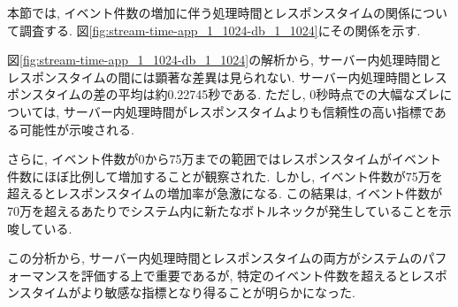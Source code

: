 \documentclass[../../../../../main]{subfiles}
\begin{document}
    \label{subsubsec:result-streaming-only-limit-time}

    本節では, イベント件数の増加に伴う処理時間とレスポンスタイムの関係について調査する. 図\ref{fig:stream-time-app_1_1024-db_1_1024}にその関係を示す.

    

    図\ref{fig:stream-time-app_1_1024-db_1_1024}の解析から, サーバー内処理時間とレスポンスタイムの間には顕著な差異は見られない. サーバー内処理時間とレスポンスタイムの差の平均は約0.22745秒である. ただし, 0秒時点での大幅なズレについては, サーバー内処理時間がレスポンスタイムよりも信頼性の高い指標である可能性が示唆される.

    さらに, イベント件数が0から75万までの範囲ではレスポンスタイムがイベント件数にほぼ比例して増加することが観察された. しかし, イベント件数が75万を超えるとレスポンスタイムの増加率が急激になる. この結果は, イベント件数が70万を超えるあたりでシステム内に新たなボトルネックが発生していることを示唆している.

    この分析から, サーバー内処理時間とレスポンスタイムの両方がシステムのパフォーマンスを評価する上で重要であるが, 特定のイベント件数を超えるとレスポンスタイムがより敏感な指標となり得ることが明らかになった.
\end{document}
